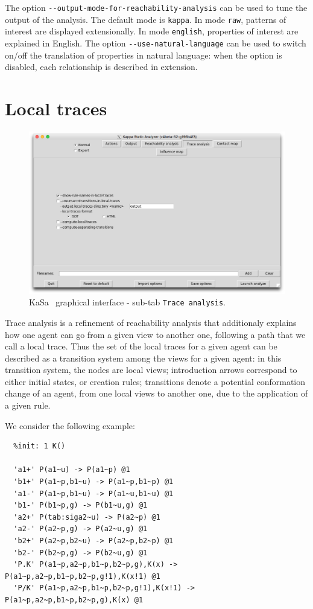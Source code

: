 \documentclass[11pt]{book}
\def\KaSa{\textsf{KaSa}}
\begin{document}
The option \verb?--output-mode-for-reachability-analysis? can be used to tune the output of the analysis. The default mode is \verb?kappa?.
In mode \verb?raw?, patterns of interest are displayed extensionally.
In mode \verb?english?, properties of interest are explained in English.
The option \verb?--use-natural-language? can be used to switch on/off the translation of properties in natural language: when the option is disabled, each relationship is described in extension.

\section{Local traces}
\label{sec:local-traces}


\begin{figure}[htbp]
\centering
\includegraphics[width=12cm,bb=0 0 1904 1208]{img/kasa_3.png}
\caption{\KaSa~ graphical interface - sub-tab \texttt{Trace analysis}.}
\label{fig:kasa:3}
\end{figure}

Trace analysis is a refinement of reachability analysis that additionaly explains how one agent can go from a given view to another one, following a path that we call a local trace.
Thus the set of the local traces for a given agent can be described as a transition system among the views for a given agent: in this transition system, the nodes are local views; introduction arrows correspond to either initial states, or creation rules; transitions denote a potential conformation change of an agent, from one local views to another one, due to the application of a given rule.

We consider the following example:
\begin{lstlisting}[language=kappa]
  %init: 1 P()
  %init: 1 K()

  'a1+' P(a1~u) -> P(a1~p) @1
  'b1+' P(a1~p,b1~u) -> P(a1~p,b1~p) @1
  'a1-' P(a1~p,b1~u) -> P(a1~u,b1~u) @1
  'b1-' P(b1~p,g) -> P(b1~u,g) @1
  'a2+' P(tab:siga2~u) -> P(a2~p) @1
  'a2-' P(a2~p,g) -> P(a2~u,g) @1
  'b2+' P(a2~p,b2~u) -> P(a2~p,b2~p) @1
  'b2-' P(b2~p,g) -> P(b2~u,g) @1
  'P.K' P(a1~p,a2~p,b1~p,b2~p,g),K(x) -> P(a1~p,a2~p,b1~p,b2~p,g!1),K(x!1) @1
  'P/K' P(a1~p,a2~p,b1~p,b2~p,g!1),K(x!1) -> P(a1~p,a2~p,b1~p,b2~p,g),K(x) @1
\end{lstlisting}
\end{document}
